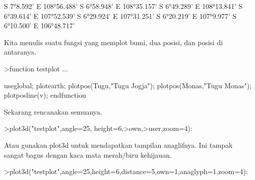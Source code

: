 \documentclass[a4paper,10pt]{article}
\begin{document}
\begin{eulernotebook}
\begin{eulercomment}
\begin{eulercomment}
\begin{eulercomment}
\begin{eulercomment}
\begin{eulercomment}
\begin{eulercomment}
\begin{eulercomment}
\begin{eulercomment}
\begin{eulercomment}
\begin{eulercomment}
\begin{eulercomment}
\begin{eulercomment}
\begin{eulercomment}
\begin{eulercomment}
\begin{eulercomment}
\begin{eulercomment}
\begin{eulercomment}
\begin{eulercomment}
\begin{eulercomment}
\begin{eulercomment}
\begin{eulercomment}
\begin{eulercomment}
\begin{eulercomment}
\begin{eulercomment}
\begin{eulercomment}
\begin{eulercomment}
\begin{eulercomment}
\begin{eulercomment}
\begin{eulercomment}
\begin{eulercomment}
\begin{eulercomment}
\begin{eulercomment}
\begin{eulercomment}
\begin{eulercomment}
\begin{eulercomment}
\begin{eulercomment}
\begin{eulercomment}
\begin{eulercomment}
\begin{eulercomment}
\begin{eulercomment}
\begin{eulercomment}
\begin{eulercomment}
\begin{euleroutput}
  S 7°8.592' E 108°56.488'
  S 6°58.948' E 108°35.157'
  S 6°49.289' E 108°13.841'
  S 6°39.614' E 107°52.539'
  S 6°29.924' E 107°31.251'
  S 6°20.219' E 107°9.977'
  S 6°10.500' E 106°48.717'
\end{euleroutput}
\begin{eulercomment}
Kita menulis suatu fungsi yang memplot bumi, dua posisi, dan posisi di
antaranya.
\end{eulercomment}
\begin{eulerprompt}
>function testplot ...
\end{eulerprompt}
\begin{eulerudf}
  useglobal;
  plotearth;
  plotpos(Tugu,"Tugu Jogja"); plotpos(Monas,"Tugu Monas");
  plotposline(v);
  endfunction
\end{eulerudf}
\begin{eulercomment}
Sekarang rencanakan semuanya.
\end{eulercomment}
\begin{eulerprompt}
>plot3d("testplot",angle=25, height=6,>own,>user,zoom=4):
\end{eulerprompt}
\begin{eulercomment}
Atau gunakan plot3d untuk mendapatkan tampilan anaglifnya. Ini tampak
sangat bagus dengan kaca mata merah/biru kehijauan.
\end{eulercomment}
\begin{eulerprompt}
>plot3d("testplot",angle=25,height=6,distance=5,own=1,anaglyph=1,zoom=4):
\end{eulerprompt}

\end{eulercomment}
\end{eulercomment}
\end{eulercomment}
\end{eulercomment}
\end{eulercomment}
\end{eulercomment}
\end{eulercomment}
\end{eulercomment}
\end{eulercomment}
\end{eulercomment}
\end{eulercomment}
\end{eulercomment}
\end{eulercomment}
\end{eulercomment}
\end{eulercomment}
\end{eulercomment}
\end{eulercomment}
\end{eulercomment}
\end{eulercomment}
\end{eulercomment}
\end{eulercomment}
\end{eulercomment}
\end{eulercomment}
\end{eulercomment}
\end{eulercomment}
\end{eulercomment}
\end{eulercomment}
\end{eulercomment}
\end{eulercomment}
\end{eulercomment}
\end{eulercomment}
\end{eulercomment}
\end{eulercomment}
\end{eulercomment}
\end{eulercomment}
\end{eulercomment}
\end{eulercomment}
\end{eulercomment}
\end{eulercomment}
\end{eulercomment}
\end{eulercomment}
\end{eulercomment}
\end{eulernotebook}
\end{document}
